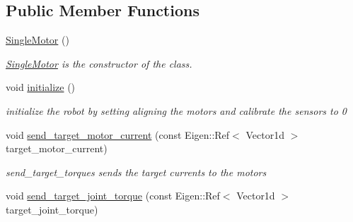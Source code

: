 \subsection*{Public Member Functions}
\begin{DoxyCompactItemize}
\item 
\hyperlink{classblmc__robots_1_1SingleMotor_a074ba2d9a982316a4aecac65b7c1b581}{Single\+Motor} ()
\begin{DoxyCompactList}\small\item\em \hyperlink{classblmc__robots_1_1SingleMotor}{Single\+Motor} is the constructor of the class. \end{DoxyCompactList}\item 
void \hyperlink{classblmc__robots_1_1SingleMotor_a2c547957aec36d6cbd02ead4882558d4}{initialize} ()\hypertarget{classblmc__robots_1_1SingleMotor_a2c547957aec36d6cbd02ead4882558d4}{}\label{classblmc__robots_1_1SingleMotor_a2c547957aec36d6cbd02ead4882558d4}

\begin{DoxyCompactList}\small\item\em initialize the robot by setting aligning the motors and calibrate the sensors to 0 \end{DoxyCompactList}\item 
void \hyperlink{classblmc__robots_1_1SingleMotor_a2fa43cd18da7598b8a41da66ef9251ff}{send\+\_\+target\+\_\+motor\+\_\+current} (const Eigen\+::\+Ref$<$ Vector1d $>$ target\+\_\+motor\+\_\+current)\hypertarget{classblmc__robots_1_1SingleMotor_a2fa43cd18da7598b8a41da66ef9251ff}{}\label{classblmc__robots_1_1SingleMotor_a2fa43cd18da7598b8a41da66ef9251ff}

\begin{DoxyCompactList}\small\item\em send\+\_\+target\+\_\+torques sends the target currents to the motors \end{DoxyCompactList}\item 
void \hyperlink{classblmc__robots_1_1SingleMotor_a09a829c726847cf4e8fd34175ce1a139}{send\+\_\+target\+\_\+joint\+\_\+torque} (const Eigen\+::\+Ref$<$ Vector1d $>$ target\+\_\+joint\+\_\+torque)\hypertarget{classblmc__robots_1_1SingleMotor_a09a829c726847cf4e8fd34175ce1a139}{}\label{classblmc__robots_1_1SingleMotor_a09a829c726847cf4e8fd34175ce1a139}


\end{DoxyCompactItemize}
